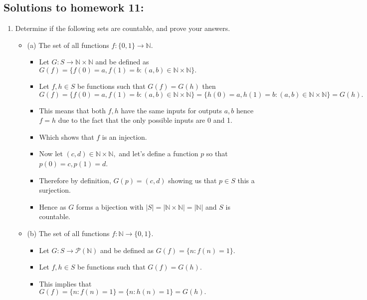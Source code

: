 \documentclass[letterpaper,12pt]{article}
\begin{document}
\subsection*{Solutions to homework 11:}

\begin{enumerate}
\item Determine if the following sets are countable, and prove your answers.
\begin{itemize}
	\item (a) The set of all functions $f:\{0,1\} \rightarrow \mathbb{N}$.
	\begin{itemize}
	\item Let $G : S \rightarrow \mathbb{N} \times \mathbb{N}$ and be defined as $G(f) = \{ f(0) = a, f(1)=b:(a,b) \in \mathbb{N} \times \mathbb{N}\}.$
	\item Let $f,h \in S$ be functions such that $G(f) = G(h)$ then $G(f) = \{ f(0) = a, f(1)=b:(a,b) \in \mathbb{N} \times \mathbb{N}\} = \{ h(0) = a, h(1)=b:(a,b) \in \mathbb{N} \times \mathbb{N}\} = G(h).$
	\item This means that both $f,h$ have the same inputs for outputs $a,b$ hence $f=h$ due to the fact that the only possible inputs are 0 and 1.
	\item Which shows that $f$ is an injection.
	\item Now let $(c,d) \in \mathbb{N} \times \mathbb{N},$ and let's define a function $p$ so that $p(0) = c, p(1) = d$.
	\item Therefore by definition, $G(p) = (c,d)$ showing us that $p \in S$ this a surjection.
	\item Hence as $G$ forms a bijection with $|S| = |\mathbb{N} \times \mathbb{N}| = |\mathbb{N}|$ and $S$ is countable.
 	\end{itemize}
	\item (b) The set of all functions $f: \mathbb{N} \rightarrow \{0,1\}.$
	\begin{itemize}
	\item Let $G : S \rightarrow \mathcal{P}(\mathbb{N})$ and be defined as $G(f) = \{n:f(n) = 1\}$.
	\item Let $f,h \in S$ be functions such that $G(f) = G(h).$
	\item This implies that $G(f) = \{n:f(n) =1 \} = \{n : h(n) = 1\} = G(h).$

\end{itemize}
\end{itemize}
\end{enumerate}
\end{document}
